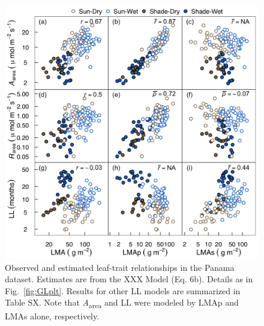 \documentclass[
  12pt,
]{article}
\providecommand{\DIFaddbeginFL}{} %
\providecommand{\DIFaddendFL}{} %
\providecommand{\DIFdelbeginFL}{} %
\providecommand{\DIFdelendFL}{} %
\newcommand{\DIFscaledelfig}{0.5}
\newlength{\DIFdelgraphicswidth} %
\newlength{\DIFdelgraphicsheight} %
\newcommand{\DIFaddincludegraphics}[2][]{{\color{blue}\fbox{\DIFOincludegraphics[#1]{#2}}}} %
\newcommand{\DIFdelincludegraphics}[2][]{%
\sbox{\DIFdelgraphicsbox}{\DIFOincludegraphics[#1]{#2}}%
\settoboxwidth{\DIFdelgraphicswidth}{\DIFdelgraphicsbox} %
\settoboxtotalheight{\DIFdelgraphicsheight}{\DIFdelgraphicsbox} %
\scalebox{\DIFscaledelfig}{%
\parbox[b]{\DIFdelgraphicswidth}{\usebox{\DIFdelgraphicsbox}\\[-\baselineskip] \rule{\DIFdelgraphicswidth}{0em}}\llap{\resizebox{\DIFdelgraphicswidth}{\DIFdelgraphicsheight}{%
\setlength{\unitlength}{\DIFdelgraphicswidth}%
\begin{picture}(1,1)%
\thicklines\linethickness{2pt} %
{\color[rgb]{1,0,0}\put(0,0){\framebox(1,1){}}}%
{\color[rgb]{1,0,0}\put(0,0){\line( 1,1){1}}}%
{\color[rgb]{1,0,0}\put(0,1){\line(1,-1){1}}}%
\end{picture}%
}\hspace*{3pt}}} %
} %
\DeclareRobustCommand{\DIFaddbeginFL}{\DIFOaddbeginFL \let\includegraphics\DIFaddincludegraphics} %
\DeclareRobustCommand{\DIFaddendFL}{\DIFOaddendFL \let\includegraphics\DIFOincludegraphics} %
\DeclareRobustCommand{\DIFdelbeginFL}{\DIFOdelbeginFL \let\includegraphics\DIFdelincludegraphics} %
\DeclareRobustCommand{\DIFdelendFL}{\DIFOaddendFL \let\includegraphics\DIFOincludegraphics} %
\begin{document}
\newpage

\begin{figure}
\DIFdelbeginFL %
\DIFdelendFL \DIFaddbeginFL \hypertarget{fig:PAplt}{%
\centering
\includegraphics{../figs/PA_scatter.png}
\caption{Observed and estimated leaf-trait relationships in the Panama dataset.
Estimates are from the XXX Model (Eq. 6b).
Details as in Fig.~\ref{fig:GLplt}.
Results for other LL models are summarized in Table SX.
Note that \emph{A}\textsubscript{area} and LL were modeled by LMAp and LMAs alone, respectively.}\label{fig:PAplt}
}
\DIFaddendFL \end{figure}

\newpage
\end{document}
